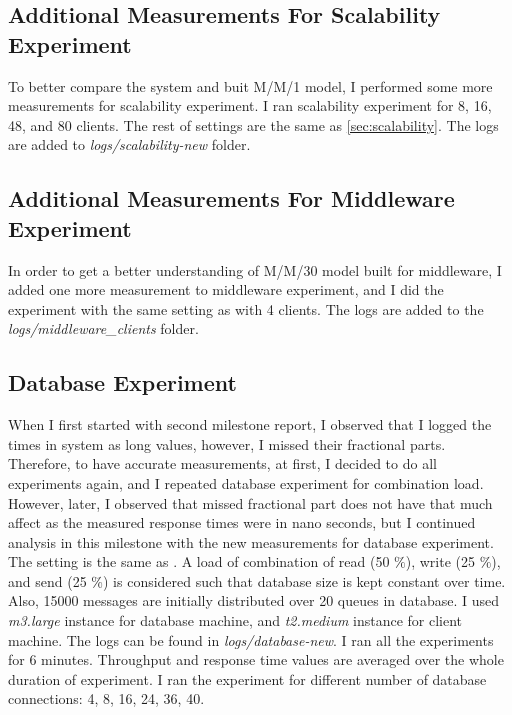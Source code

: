 \documentclass[11pt]{article}
\begin{document}
\begin{appendices}
\subsection{Additional Measurements For Scalability Experiment}
\label{sec:scalability-additional}

To better compare the system and buit M/M/1 model, I performed some more measurements for scalability experiment.
I ran scalability experiment for 8, 16, 48, and 80 clients. The rest of settings are the same as 
\cref{sec:scalability}. The logs are added to \emph{logs/scalability-new} folder.

\subsection{Additional Measurements For Middleware Experiment}
\label{sec:middleware}

In order to get a better understanding of M/M/30 model built for middleware, I added one more measurement to 
middleware experiment, and I did the experiment with the same setting as \cite[section~1.2.4]{ms1} with 4 clients.
The logs are added to the \emph{logs/middleware\_clients} folder.

\subsection{Database Experiment}
\label{sec:database}
When I first started with second milestone report, I observed that I logged the times in system 
as long values, however, I missed their fractional parts. Therefore, to have accurate measurements, 
at first, I decided to do all experiments again, and I repeated  
database experiment for combination load. However, later, I observed that missed fractional part does not have that much 
affect as the measured response times were in nano seconds, but I continued analysis in this 
milestone with the new measurements for database experiment. The setting is the same as \cite[section~1.1.4]{ms1}. 
A load of combination of read (50 $\%$), write (25 $\%$), and send (25 $\%$) is considered such that
database size is kept constant over time. Also, 15000 messages are initially distributed over 20 queues
in database. I used \emph{m3.large} instance for database machine, and \emph{t2.medium} instance for 
client machine. The logs can be found in
\emph{logs/database-new}. I ran all the experiments for 6 minutes. Throughput and response time values are 
averaged over the whole duration of experiment. I ran the experiment for different number of database connections:
4, 8, 16, 24, 36, 40.



\end{appendices}
\end{document}
